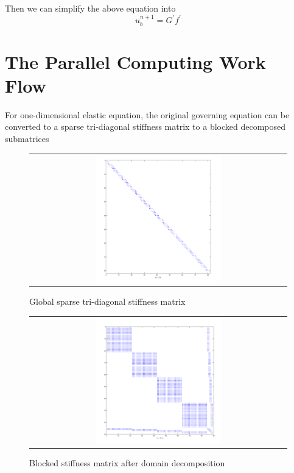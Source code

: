 Then we can simplify the above equation into
\begin{equation}
u_{b}^{n+1} = G^{'} f^{'}
\end{equation}

\section{The Parallel Computing Work Flow}

For one-dimensional elastic equation, the original governing equation can be converted to a sparse tri-diagonal stiffness matrix to a blocked decomposed submatrices

 \begin{figure}[h]
 	\centering
 	\begin{tabular}{c}
 		\includegraphics[width=0.5\textwidth]{./pics/matrix1.png}
 	\end{tabular}
 	\caption{\footnotesize Global sparse tri-diagonal stiffness matrix}
 \end{figure}
 
  \begin{figure}[h]
  	\centering
  	\begin{tabular}{c}
  		\includegraphics[width=0.5\textwidth]{./pics/hmatrix1.png}
  	\end{tabular}
  	\caption{\footnotesize Blocked stiffness matrix after domain decomposition}
  \end{figure}
  
